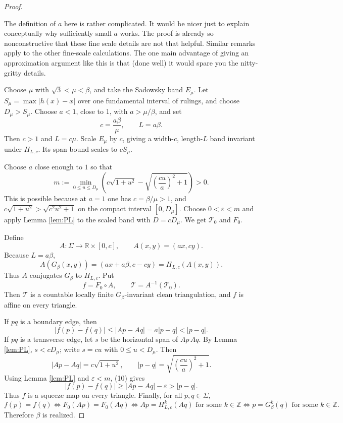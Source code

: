\documentclass[12pt]{article}
\newcommand{\R}{\mathbb R}
\newcommand{\Z}{\mathbb Z}
\theoremstyle{plain}
\newcommand{\review}[1]{\begin{reviewbox}#1\end{reviewbox}}
\begin{document}
\begin{proof}

\review{The definition of $a$ here is rather complicated. It would be nicer just to explain conceptually why sufficiently small $a$ works.  The proof is already so nonconstructive that these fine scale details are not that helpful. Similar remarks apply to the other fine-scale calculations. The one main advantage of giving an approximation argument like this is that (done well) it would spare you the nitty-gritty details.}


Choose \(\mu\) with \(\sqrt3<\mu<\beta\), and take the Sadowsky band
\(E_\mu\).  Let \(S_\mu=\max |h(x)-x|\) over one fundamental interval of
rulings, and choose \(D_\mu>S_\mu\).  Choose \(a<1\), close to \(1\), with
\(a>\mu/\beta\), and set
\[
c=\frac{a\beta}{\mu},\qquad L=a\beta.
\]
Then \(c>1\) and \(L=c\mu\).  Scale \(E_\mu\) by \(c\), giving a width-\(c\),
length-\(L\) band invariant under \(H_{L,c}\).  Its span bound scales to
\(cS_\mu\).

Choose \(a\) close enough to \(1\) so that
\[
m:=\min_{0\le u\le D_\mu}
\left(c\sqrt{1+u^2}-\sqrt{\left(\frac{cu}{a}\right)^2+1}\right)>0. \tag{10}
\]
This is possible because at \(a=1\) one has \(c=\beta/\mu>1\), and
\(c\sqrt{1+u^2}>\sqrt{c^2u^2+1}\) on the compact interval
\([0,D_\mu]\).  Choose \(0<\varepsilon<m\) and apply Lemma \ref{lem:PL} to the
scaled band with \(D=cD_\mu\).  We get \(\mathcal T_0\) and \(F_0\).

Define
\[
A:\Sigma\to\R\times[0,c],\qquad A(x,y)=(ax,cy).
\]
Because \(L=a\beta\),
\[
A(G_\beta(x,y))=(ax+a\beta,c-cy)=H_{L,c}(A(x,y)).
\]
Thus \(A\) conjugates \(G_\beta\) to \(H_{L,c}\).  Put
\[
f=F_0\circ A,\qquad \mathcal T=A^{-1}(\mathcal T_0).
\]
Then \(\mathcal T\) is a countable locally finite \(G_\beta\)-invariant clean
triangulation, and \(f\) is affine on every triangle.

If \(pq\) is a boundary edge, then
\[
|f(p)-f(q)|\le |A p-A q|=a|p-q|<|p-q|.
\]
If \(pq\) is a transverse edge, let \(s\) be the horizontal span of
\(A p\,A q\).  By Lemma \ref{lem:PL}, \(s<cD_\mu\); write \(s=cu\) with
\(0\le u<D_\mu\).  Then
\[
|Ap-Aq|=c\sqrt{1+u^2},\qquad
|p-q|=\sqrt{\left(\frac{cu}{a}\right)^2+1}.
\]
Using Lemma \ref{lem:PL} and \(\varepsilon<m\), (10) gives
\[
|f(p)-f(q)|
\ge |Ap-Aq|-\varepsilon
> |p-q|.
\]
Thus \(f\) is a squeeze map on every triangle.  Finally, for all
\(p,q\in\Sigma\),
\[
f(p)=f(q)
\Longleftrightarrow
F_0(Ap)=F_0(Aq)
\Longleftrightarrow
Ap=H_{L,c}^k(Aq)\text{ for some }k\in\Z
\Longleftrightarrow
p=G_\beta^k(q)\text{ for some }k\in\Z.
\]
Therefore \(\beta\) is realized.
\end{proof}
\end{document}
